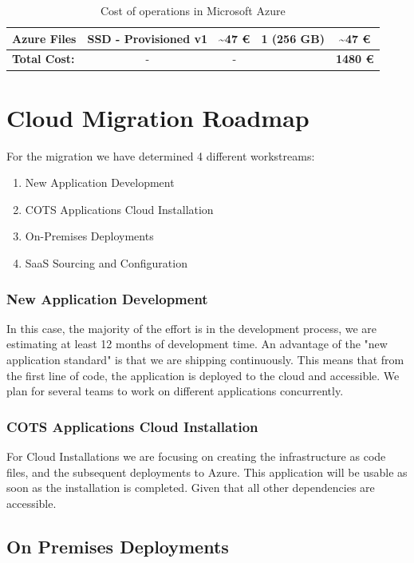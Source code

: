 \documentclass{llncs}
\begin{document}
\begin{table}[htbp]
\begin{tabular}{|l|c|c|c|c|}
        \hline
 Azure Files                  & SSD - Provisioned v1  & \textasciitilde 47 €                 & 1 (256 GB)        & \textasciitilde 47 €                \\
        \hline
        \textbf{Total Cost:}         & -                     & -                                    &                   & \textbf{1480  €}                    \\
        \hline
    \end{tabular}
    \caption{Cost of operations in Microsoft Azure}
    \label{tab:Cost_Operation_Monthly}
\end{table}


\section{Cloud Migration Roadmap}

For the migration we have determined 4 different workstreams:
\begin{enumerate}
    \item New Application Development
    \item COTS Applications Cloud Installation
    \item On-Premises Deployments
    \item SaaS Sourcing and Configuration
\end{enumerate}

\subsubsection{New Application Development}
In this case, the majority of the effort is in the development process, we are estimating at least 12 months of development time. An advantage of the "new application standard" is that we are shipping continuously.
This means that from the first line of code, the application is deployed to the cloud and accessible. We plan for several teams to work on different applications concurrently.

\subsubsection{COTS Applications Cloud Installation}
For Cloud Installations we are focusing on creating the infrastructure as code files, and the subsequent deployments to Azure. This application will be usable as soon as the installation is completed. Given that all other dependencies are accessible.

\subsection{On Premises Deployments}
\end{document}
